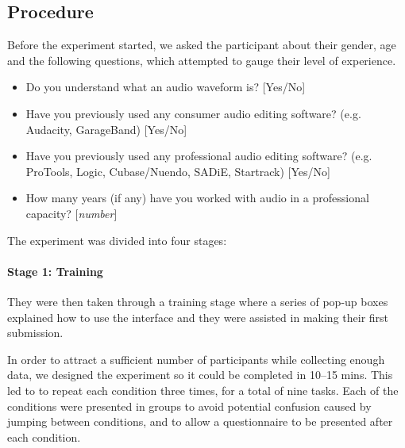 


\subsection{Procedure}

Before the experiment started, we asked the participant about
their gender, age and the following questions, which attempted to gauge their level of
experience.

{\singlespacing
\begin{itemize}
  \item Do you understand what an audio waveform is? [Yes/No]
  \item Have you previously used any consumer audio editing software? (e.g.
    Audacity, GarageBand) [Yes/No]
  \item Have you previously used any professional audio editing software? (e.g.
    ProTools, Logic, Cubase/Nuendo, SADiE, Startrack) [Yes/No]
  \item How many years (if any) have you worked with audio in a professional
    capacity? [\textit{number}]
\end{itemize}
}

The experiment was divided into four stages:

\paragraph{Stage 1: Training}
They were then taken through a training stage where a series of
pop-up boxes explained how to use the interface and they were assisted in making their first submission.

In order to attract a sufficient number of participants while collecting enough data, we designed the experiment so it
could be completed in 10--15 mins. This led to to repeat each condition three times, for a total of nine tasks.
Each of the conditions were presented in groups to avoid potential confusion caused by jumping between conditions, and
to allow a questionnaire to be presented after each condition.

